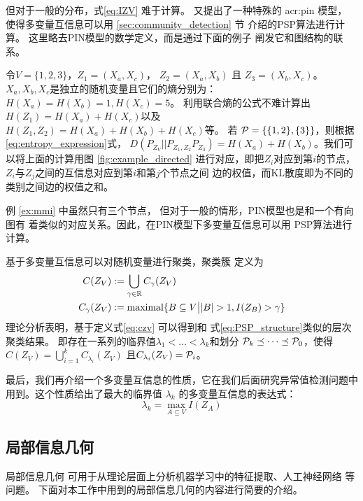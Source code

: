 但对于一般的分布，式\eqref{eq:IZV}
难于计算。\citet{chan2017pin} 又提出了一种特殊的 \gls{acr:pin} 模型，
使得多变量互信息可以用 \ref{sec:community_detection} 节
介绍的PSP算法进行计算。
这里略去PIN模型的数学定义，而是通过下面的例子
阐发它和图结构的联系。
\begin{example}\label{ex:mmi}
  令$V=\{1,2,3\}$，$Z_1=(X_a, X_c)$，
  $Z_2=(X_a,X_b)$ 且 $Z_3=(X_b,X_c)$。
  $X_a,X_b,X_c$是独立的随机变量且它们的熵分别为：
  $H(X_a)=H(X_b)=1, H(X_c)=5$。
  利用联合熵的公式不难计算出$H(Z_1)=H(X_a)+H(X_c)$以及
  $H(Z_1, Z_2) = H(X_a) + H(X_b) + H(X_c)$等。
  若 $\P=\{\{1,2\}, \{3\}\}$，则根据
  \eqref{eq:entropy_expression}式，
  $D(P_{Z_V}||P_{Z_1,Z_2}P_{Z_3}) = H(X_a)
  +H(X_b)$。我们可以将上面的计算用图 \ref{fig:example_directed} 
  进行对应，即把$Z_i$对应到第$i$的节点，
  $Z_i$与$Z_j$之间的互信息对应到第$i$和第$j$个节点之间
  边的权值，而KL散度即为不同的类别之间边的权值之和。
\end{example}
例 \ref{ex:mmi} 中虽然只有三个节点，
但对于一般的情形，PIN模型也是和一个有向图有
着类似的对应关系。因此，在PIN模型下多变量互信息可以用
PSP算法进行计算。

基于多变量互信息可以对随机变量进行聚类，聚类簇
定义为
\begin{align}
  C(Z_V) &:= \bigcup_{\gamma \in \R} C_{\gamma}(Z_V)
  \label{eq:czv}\\
  C_{\gamma}(Z_V) &:= \textrm{maximal}
  \{ B \subseteq V \big\vert |B|>1, I(Z_B) > \gamma  \}
\end{align}
理论分析表明，基于定义式\eqref{eq:czv} 可以得到和
式\eqref{eq:PSP_structure}类似的层次聚类结果。
即存在一系列的临界值$\lambda_1 < \dots < \lambda_k$和划分
$\P_k \preceq \dots \preceq \P_0$，使得
$C(Z_V) = \bigcup_{i=1}^{k} C_{\lambda_i}(Z_V)$
且$C_{\lambda_i}(Z_V) = \P_i$。

最后，我们再介绍一个多变量互信息的性质，它在我们后面研究异常值检测问题中
用到。这个性质给出了最大的临界值 $\lambda_k$
的多变量互信息的表达式\cite{agg_ic}：
\begin{equation}\label{eq:largest_threshold}
\lambda_k = \max_{A\subseteq V} I(Z_A)
\end{equation}

\subsection{局部信息几何}\label{sec:local_geometry}
局部信息几何\cite{huang2019universal}
可用于从理论层面上分析机器学习中的特征提取\cite{huang2017information}、人工神经网络
\cite{huang2019information}等问题。
下面对本工作中用到的局部信息几何的内容进行简要的介绍。

